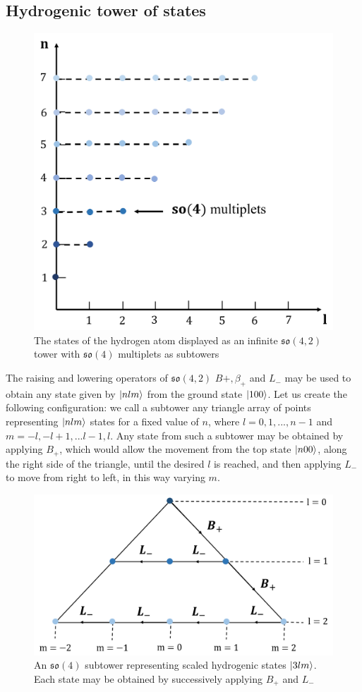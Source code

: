 \documentclass[12pt,a4paper]{report}
\theoremstyle{definition}
\theoremstyle{remark}
\theoremstyle{remark}
\begin{document}
\subsection{Hydrogenic tower of states}
\begin{figure}[!hbt]
\begin{center}
\includegraphics[width=0.7\columnwidth]{tower_3.png}
\caption{The states of the hydrogen atom displayed as an infinite $\mathfrak{so}(4,2)$ tower with $\mathfrak{so}(4)$ multiplets as subtowers\cite{wybourne}}
\label{fig:tower_3}
\end{center}
\end{figure}
The raising and lowering operators of $\mathfrak{so}(4,2)$ $B+,\beta_+$ and $L_-$ may be used to obtain any state given by $\ket{nlm}$ from the ground state $\ket{100}$. Let us create the following configuration: we call a subtower any triangle array of points representing $\ket{nlm}$ states for a fixed value of $n$, where $l=0,1,...,n-1$ and $m=-l,-l+1,...l-1,l$. Any state from such a subtower may be obtained by applying $B_+$, which would allow the movement from the top state $\ket{n00}$, along the right side of the triangle, until the desired $l$ is reached, and then applying $L_-$ to move from right to left, in this way varying $m$.

\begin{figure}[!hbt]
\begin{center}
\includegraphics[width=0.9\columnwidth]{tower_2.png}
\caption{An $\mathfrak{so}(4)$ subtower representing scaled hydrogenic states $\ket{3lm}$. Each state may be obtained by successively applying $B_+$ and $L_-$}
\label{fig:tower_2}
\end{center}
\end{figure}
\end{document}
